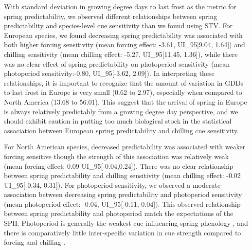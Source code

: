 \documentclass[12pt]{article}
\begin{document}
With standard deviation in growing degree days to last frost as the metric for spring predictability, we observed different relationships between spring predictability and species-level cue sensitivity than we found using STV. For European species, we found decreasing spring predictability was associated with both higher forcing sensitivity (mean forcing effect: -3.61, UI_{95}[9.04, 1.64]) and chilling sensitivity (mean chilling effect: -5.27, UI_{95}[11.45, 1.36]), while there was no clear effect of spring predictability on photoperiod sensitivity (mean photoperiod sensitivity:-0.80, UI_{95}[-3.62, 2.09]). In interpreting these relationships, it is important to recognize that the amount of variation in GDDs to last frost in Europe is very small (0.62 to 2.97), especially when compared to North America (13.68 to 56.01). This suggest that the arrival of spring in Europe is always relatively predictably from a growing degree day perspective, and we should exhibit caution in putting too much biological stock in the statistical association between European spring predictability and chilling cue sensitivity.

For North American species, decreased predictability was associated with weaker forcing sensitive though the strength of this association was relatively weak (mean forcing effect: 0.09 UI_{95}[-0.04,0.24]). There was no clear relationship between spring predictability and chilling sensitivity (mean chilling effect: -0.02 UI_{95}[-0.34, 0.31]). For photoperiod sensitivity, we observed a moderate association between decreasing spring predictability and photoperiod sensitivity (mean photoperiod effect: -0.04, UI_{95}[-0.11, 0.04]). This observed relationship between spring predictability and photoperiod match the expectations of the SPH. Photoperiod is generally the weakest cue influencing spring phenology \citep{Ettinger:2020aa}, and there is comparatively little inter-specific variation in cue strength compared to forcing and chilling \citep{Morales-Castilla:2024vp}. 
\end{document}
